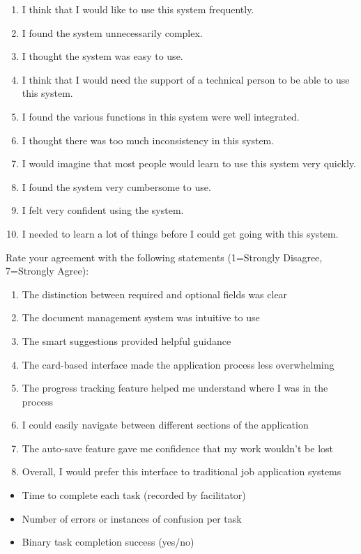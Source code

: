 \documentclass[
	letterpaper, %
]{jdf}
\begin{document}
\begin{sloppypar}
\begin{enumerate}
    \item I think that I would like to use this system frequently.
    \item I found the system unnecessarily complex.
    \item I thought the system was easy to use.
    \item I think that I would need the support of a technical person to be able to use this system.
    \item I found the various functions in this system were well integrated.
    \item I thought there was too much inconsistency in this system.
    \item I would imagine that most people would learn to use this system very quickly.
    \item I found the system very cumbersome to use.
    \item I felt very confident using the system.
    \item I needed to learn a lot of things before I could get going with this system.
\end{enumerate}

Rate your agreement with the following statements (1=Strongly Disagree, 7=Strongly Agree):
\begin{enumerate}
    \item The distinction between required and optional fields was clear
    \item The document management system was intuitive to use
    \item The smart suggestions provided helpful guidance
    \item The card-based interface made the application process less overwhelming
    \item The progress tracking feature helped me understand where I was in the process
    \item I could easily navigate between different sections of the application
    \item The auto-save feature gave me confidence that my work wouldn't be lost
    \item Overall, I would prefer this interface to traditional job application systems
\end{enumerate}

\begin{itemize}
    \item Time to complete each task (recorded by facilitator)
    \item Number of errors or instances of confusion per task
    \item Binary task completion success (yes/no)
\end{itemize}


\end{sloppypar}
\end{document}
